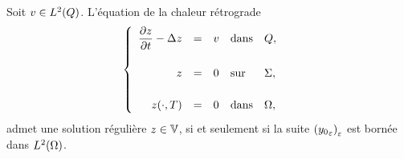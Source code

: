 \begin{theoreme}\label{thm:controllability-result-5}%
    Soit $v\in L^{2}\!\left({Q}\right)$. L'équation de la chaleur rétrograde
    \begin{equation}\label{eq:initial-problem-2}
        \begin{cases}\displaystyle
            \begin{array}{rclll}
                \dfrac{\partial{}z}{\partial{}t} - \Delta z & = & v & \text{dans} & Q,\\
                \\
                z & = & 0 & \text{sur} & \Sigma,\\
                \\
                z(\cdot,T) & = & 0 & \text{dans} & \Omega,
            \end{array}
        \end{cases}
    \end{equation}
    admet une solution régulière $z\in \mathbb{V}$, si et seulement si la
    suite $\displaystyle {\left({{y_{0}}_{\varepsilon}}\right)}_{\varepsilon}$ est
    bornée dans $L^{2}\!\left({\Omega}\right)$.
\end{theoreme}

